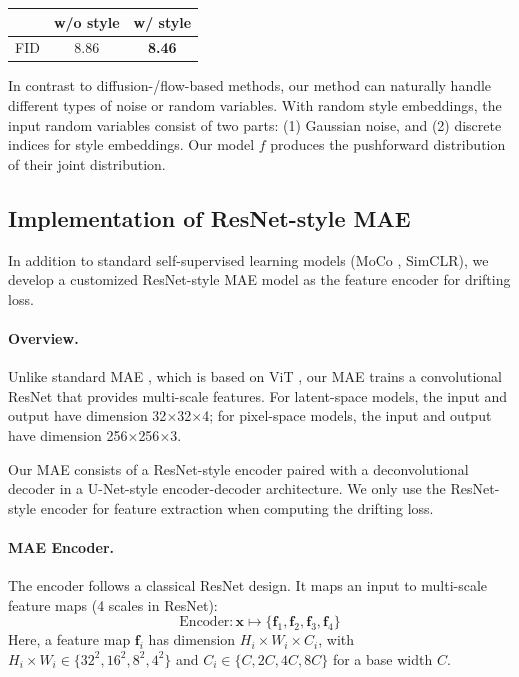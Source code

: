 \begin{center}
\tablefontsize
\begin{tabular}{c|cc}
\toprule
 & w/o style & w/ style \\
\midrule
FID & 8.86 & \textbf{8.46} \\
\bottomrule
\end{tabular}
\end{center}

In contrast to diffusion-/flow-based methods, our method can naturally handle different types of noise or random variables.
With random style embeddings, the input random variables consist of two parts: (1) Gaussian noise, and (2) discrete indices for style embeddings. Our model $f$ produces the pushforward distribution of their joint distribution. 

\subsection{Implementation of ResNet-style MAE}
\label{sec:appendix_latent_mae}

In addition to standard self-supervised learning models (MoCo \cite{he2020momentum}, SimCLR\cite{chen2020simple}), we develop a customized ResNet-style MAE model as the feature encoder for drifting loss.

\paragraph{Overview.}
Unlike standard MAE \cite{he2022masked}, which is based on ViT \cite{Dosovitskiy2021}, our MAE trains a convolutional ResNet that provides multi-scale features.
For latent-space models, the input and output have dimension 32$\times$32$\times$4;
for pixel-space models, the input and output have dimension 256$\times$256$\times$3.

Our MAE consists of a ResNet-style encoder paired with a deconvolutional decoder in a U-Net-style \cite{ronneberger2015u} encoder-decoder architecture.
We only use the ResNet-style encoder for feature extraction when computing the drifting loss.

\paragraph{MAE Encoder.}
The encoder follows a classical ResNet \cite{he2016deep} design.
It maps an input to multi-scale feature maps (4 scales in ResNet):
\[
\text{Encoder}: \mathbf{x} \mapsto \{\mathbf{f}_1, \mathbf{f}_2, \mathbf{f}_3, \mathbf{f}_4\}
\]
Here, a feature map $\mathbf{f}_i$ has dimension $H_i{\times}W_i{\times}C_i$, with $H_i{\times}W_i \in \{32^2, 16^2, 8^2, 4^2\}$ and $C_i \in \{C, 2C, 4C, 8C\}$ for a base width $C$.

